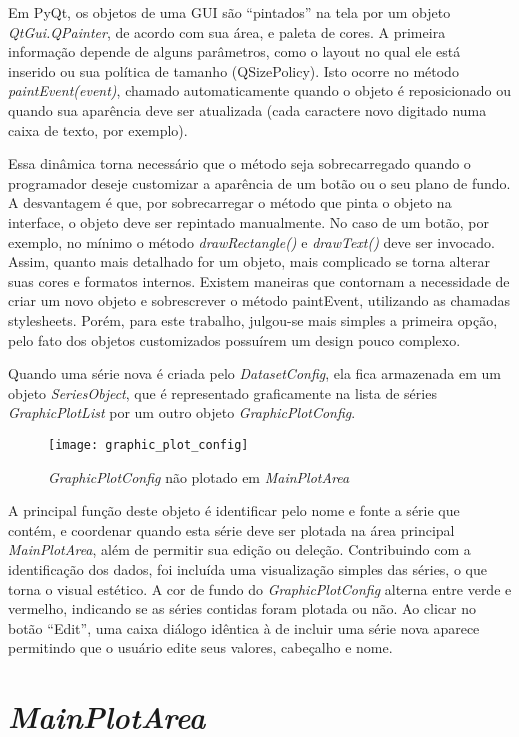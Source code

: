 Em PyQt, os objetos de uma GUI são “pintados” na tela por um objeto \emph{QtGui.QPainter}, de acordo com sua área, e paleta de cores. A primeira informação depende de alguns parâmetros, como o layout no qual ele está inserido ou sua política de tamanho (QSizePolicy). Isto ocorre no método \emph{paintEvent(event)}, chamado automaticamente quando o objeto é reposicionado ou quando sua aparência deve ser atualizada (cada caractere novo digitado numa caixa de texto, por exemplo).

Essa dinâmica torna necessário que o método seja sobrecarregado quando o programador deseje customizar a aparência de um botão ou o seu plano de fundo. A desvantagem é que, por sobrecarregar o método que pinta o objeto na interface, o objeto deve ser repintado manualmente. No caso de um botão, por exemplo, no mínimo o método \emph{drawRectangle()} e \emph{drawText()} deve ser invocado. Assim, quanto mais detalhado for um objeto, mais complicado se torna alterar suas cores e formatos internos. Existem maneiras que contornam a necessidade de criar um novo objeto e sobrescrever o método paintEvent, utilizando as chamadas stylesheets. Porém, para este trabalho, julgou-se mais simples a primeira opção, pelo fato dos objetos customizados possuírem um design pouco complexo.

Quando uma série nova é criada pelo \emph{DatasetConfig}, ela fica armazenada em um objeto \emph{SeriesObject}, que é representado graficamente na lista de séries \emph{GraphicPlotList} por um outro objeto \emph{GraphicPlotConfig}.

\begin{figure}
	\centering
	\texttt{[image: graphic\_plot\_config]}
	\caption{\emph{GraphicPlotConfig} não plotado em \emph{MainPlotArea}}
	\label{img_graphic_plot_config}
\end{figure}

A principal função deste objeto é identificar pelo nome e fonte a série que contém, e coordenar quando esta série deve ser plotada na área principal \emph{MainPlotArea}, além de permitir sua edição ou deleção. Contribuindo com a identificação dos dados, foi incluída uma visualização simples das séries, o que torna o visual estético. A cor de fundo do \emph{GraphicPlotConfig} alterna entre verde e vermelho, indicando se as séries contidas foram plotada ou não. Ao clicar no botão “Edit”, uma caixa diálogo idêntica à de incluir uma série nova aparece permitindo que o usuário edite seus valores, cabeçalho e nome.

\section{\emph{MainPlotArea}}

